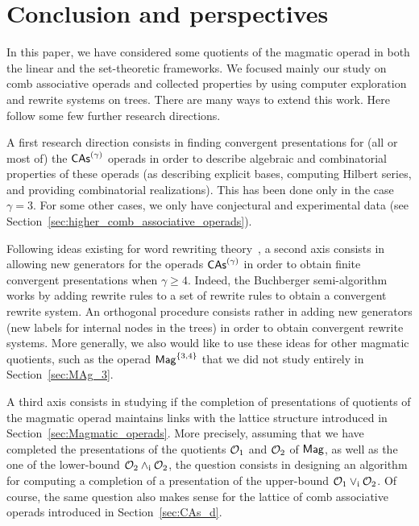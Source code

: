 \section*{Conclusion and perspectives}
In this paper, we have considered some quotients of the magmatic operad
in both the linear and the set-theoretic frameworks. We focused mainly
our study on comb associative operads and collected properties by
using computer exploration and rewrite systems on trees. There are many
ways to extend this work. Here follow some few further research
directions.
\medbreak

A first research direction consists in finding convergent presentations
for (all or most of) the $\mathsf{CAs}^{\left(\gamma\right)}$ operads in
order to describe algebraic and combinatorial properties of these
operads (as describing explicit bases, computing Hilbert
series, and providing combinatorial realizations). This has been
done only in the case $\gamma = 3$. For some other cases, we only have
conjectural and experimental data (see
Section~\ref{sec:higher_comb_associative_operads}).
\medbreak

Following ideas existing for word rewriting theory~\cite{GGM15}, a
second axis consists in allowing new generators for the operads
$\mathsf{CAs}^{\left(\gamma\right)}$ in order to obtain finite convergent presentations
when $\gamma \geq 4$. Indeed, the Buchberger semi-algorithm works by
adding rewrite rules to a set of rewrite rules to obtain a convergent
rewrite system. An orthogonal procedure consists rather in adding new
generators (new labels for internal nodes in the trees) in order to
obtain convergent rewrite systems. More generally, we also would like to
use these ideas for other magmatic quotients, such as the operad
$\mathsf{Mag}^{\{3, 4\}}$ that we did not study entirely in
Section~\ref{sec:MAg_3}.
\medbreak

A third axis consists in studying if the completion of presentations of
quotients of the magmatic operad maintains links with
the lattice structure introduced in Section~\ref{sec:Magmatic_operads}.
More precisely, assuming that we have completed the presentations of
the quotients $\mathcal{O}_1$ and $\mathcal{O}_2$ of $\mathsf{Mag}$,
as well as the one of the lower-bound $\mathcal{O}_2 \wedge_{\mathrm{i}} \mathcal{O}_2$, the
question consists in designing an algorithm for computing a completion
of a presentation of the upper-bound
$\mathcal{O}_1 \vee_{\mathrm{i}} \mathcal{O}_2$. Of course, the same question also makes sense
for the lattice of comb associative operads introduced in
Section~\ref{sec:CAs_d}.
\medbreak

